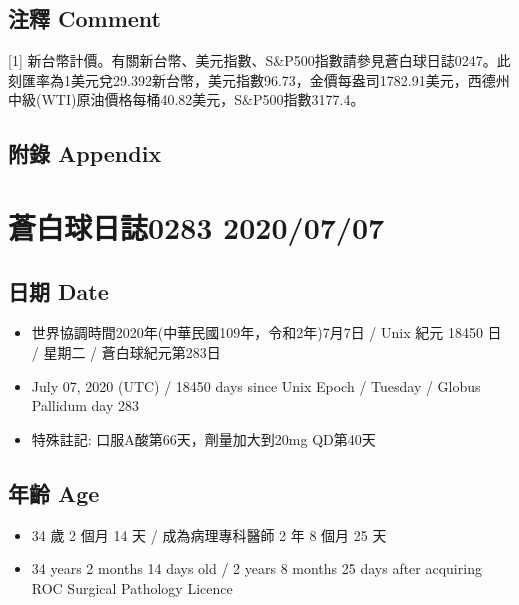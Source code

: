 \documentclass[
]{article}
\providecommand{\tightlist}{%
  \setlength{\itemsep}{0pt}\setlength{\parskip}{0pt}}
\begin{document}
\hypertarget{ux6ce8ux91cb-comment-5}{%
\subsection{注釋 Comment}\label{ux6ce8ux91cb-comment-5}}

{[}1{]}
新台幣計價。有關新台幣、美元指數、S\&P500指數請參見蒼白球日誌0247。此刻匯率為1美元兌29.392新台幣，美元指數96.73，金價每盎司1782.91美元，西德州中級(WTI)原油價格每桶40.82美元，S\&P500指數3177.4。

\hypertarget{ux9644ux9304-appendix-5}{%
\subsection{附錄 Appendix}\label{ux9644ux9304-appendix-5}}

\hypertarget{ux84bcux767dux7403ux65e5ux8a8c0283-20200707}{%
\section{蒼白球日誌0283
2020/07/07}\label{ux84bcux767dux7403ux65e5ux8a8c0283-20200707}}

\hypertarget{ux65e5ux671f-date-6}{%
\subsection{日期 Date}\label{ux65e5ux671f-date-6}}

\begin{itemize}
\tightlist
\item
  世界協調時間2020年(中華民國109年，令和2年)7月7日 / Unix 紀元 18450 日
  / 星期二 / 蒼白球紀元第283日
\item
  July 07, 2020 (UTC) / 18450 days since Unix Epoch / Tuesday / Globus
  Pallidum day 283
\item
  特殊註記: 口服A酸第66天，劑量加大到20mg QD第40天
\end{itemize}

\hypertarget{ux5e74ux9f61-age-6}{%
\subsection{年齡 Age}\label{ux5e74ux9f61-age-6}}

\begin{itemize}
\tightlist
\item
  34 歲 2 個月 14 天 / 成為病理專科醫師 2 年 8 個月 25 天
\item
  34 years 2 months 14 days old / 2 years 8 months 25 days after
  acquiring ROC Surgical Pathology Licence
\end{itemize}
\end{document}
